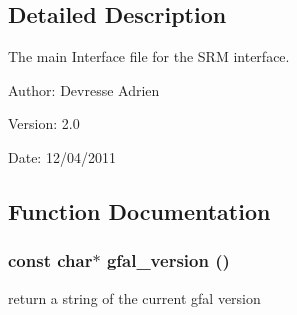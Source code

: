 \subsection{Detailed Description}
The main Interface file for the SRM interface. 

\begin{Desc}
\item[Author:]Devresse Adrien \end{Desc}
\begin{Desc}
\item[Version:]2.0 \end{Desc}
\begin{Desc}
\item[Date:]12/04/2011 \end{Desc}


\subsection{Function Documentation}
\subsubsection{\setlength{\rightskip}{0pt plus 5cm}const char$\ast$ gfal\_\-version ()}\label{gfal__common__interface_8h_a5a8df616e6a5e6fc1d94e2374c7ccf2}


return a string of the current gfal version 